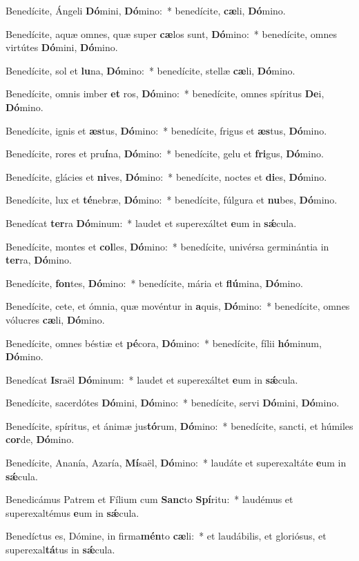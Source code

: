 \item Benedícite, Ángeli \textbf{Dó}mini, \textbf{Dó}mino:~* benedícite, \textbf{cæ}li, \textbf{Dó}mino.
\item Benedícite, aquæ omnes, quæ super \textbf{cæ}los sunt, \textbf{Dó}mino:~* benedícite, omnes virtútes \textbf{Dó}mini, \textbf{Dó}mino.
\item Benedícite, sol et \textbf{lu}na, \textbf{Dó}mino:~* benedícite, stellæ \textbf{cæ}li, \textbf{Dó}mino.
\item Benedícite, omnis imber \textbf{et} ros, \textbf{Dó}mino:~* benedícite, omnes spíritus \textbf{De}i, \textbf{Dó}mino.
\item Benedícite, ignis et \textbf{æs}tus, \textbf{Dó}mino:~* benedícite, frigus et \textbf{æs}tus, \textbf{Dó}mino.
\item Benedícite, rores et pru\textbf{í}na, \textbf{Dó}mino:~* benedícite, gelu et \textbf{fri}gus, \textbf{Dó}mino.
\item Benedícite, glácies et \textbf{ni}ves, \textbf{Dó}mino:~* benedícite, noctes et \textbf{di}es, \textbf{Dó}mino.
\item Benedícite, lux et \textbf{té}nebræ, \textbf{Dó}mino:~* benedícite, fúlgura et \textbf{nu}bes, \textbf{Dó}mino.
\item Benedícat \textbf{ter}ra \textbf{Dó}minum:~* laudet et superexáltet \textbf{e}um in \textbf{sǽ}cula.
\item Benedícite, montes et \textbf{col}les, \textbf{Dó}mino:~* benedícite, univérsa germinántia in \textbf{ter}ra, \textbf{Dó}mino.
\item Benedícite, \textbf{fon}tes, \textbf{Dó}mino:~* benedícite, mária et \textbf{flú}mina, \textbf{Dó}mino.
\item Benedícite, cete, et ómnia, quæ movéntur in \textbf{a}quis, \textbf{Dó}mino:~* benedícite, omnes vólucres \textbf{cæ}li, \textbf{Dó}mino.
\item Benedícite, omnes béstiæ et \textbf{pé}cora, \textbf{Dó}mino:~* benedícite, fílii \textbf{hó}minum, \textbf{Dó}mino.
\item Benedícat \textbf{Is}raël \textbf{Dó}minum:~* laudet et superexáltet \textbf{e}um in \textbf{sǽ}cula.
\item Benedícite, sacerdótes \textbf{Dó}mini, \textbf{Dó}mino:~* benedícite, servi \textbf{Dó}mini, \textbf{Dó}mino.
\item Benedícite, spíritus, et ánimæ jus\textbf{tó}rum, \textbf{Dó}mino:~* benedícite, sancti, et húmiles \textbf{cor}de, \textbf{Dó}mino.
\item Benedícite, Ananía, Azaría, \textbf{Mí}saël, \textbf{Dó}mino:~* laudáte et superexaltáte \textbf{e}um in \textbf{sǽ}cula.
\item Benedicámus Patrem et Fílium cum \textbf{Sanc}to \textbf{Spí}ritu:~* laudémus et superexaltémus \textbf{e}um in \textbf{sǽ}cula.
\item Benedíctus es, Dómine, in firma\textbf{mén}to \textbf{cæ}li:~* et laudábilis, et gloriósus, et superexal\textbf{tá}tus in \textbf{sǽ}cula.
